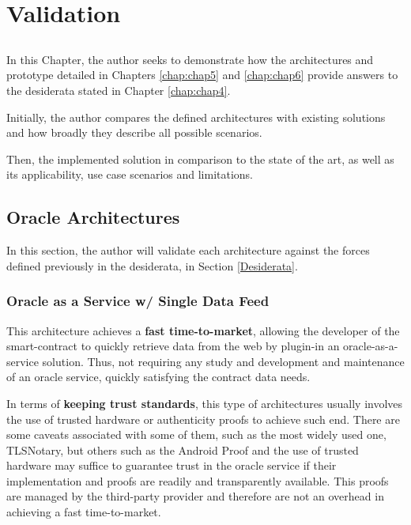 \chapter{Validation} \label{chap:chap7}

\section*{}
In this Chapter, the author seeks to demonstrate how the architectures and prototype detailed in Chapters \ref{chap:chap5} and \ref{chap:chap6} provide answers to the desiderata stated in Chapter \ref{chap:chap4}.

Initially, the author compares the defined architectures with existing solutions and how broadly they describe all possible scenarios.

Then, the implemented solution in comparison to the state of the art, as well as its applicability, use case scenarios and limitations.


\section{Oracle Architectures}
In this section, the author will validate each architecture against the forces defined previously in the desiderata, in Section \ref{Desiderata}.


\subsection{Oracle as a Service w/ Single Data Feed}\label{OaaS w/SDF}
This architecture achieves a \textbf{fast time-to-market}, allowing the developer of the smart-contract to quickly retrieve data from the web by plugin-in an oracle-as-a-service solution. Thus, not requiring any study and development and maintenance of an oracle service, quickly satisfying the contract data needs.

In terms of \textbf{keeping trust standards}, this type of architectures usually involves the use of trusted hardware or authenticity proofs to achieve such end. There are some caveats associated with some of them, such as the most widely used one, TLSNotary, but others such as the Android Proof and the use of trusted hardware may suffice to guarantee trust in the oracle service if their implementation and proofs are readily and transparently available. This proofs are managed by the third-party provider and therefore are not an overhead in achieving a fast time-to-market.


